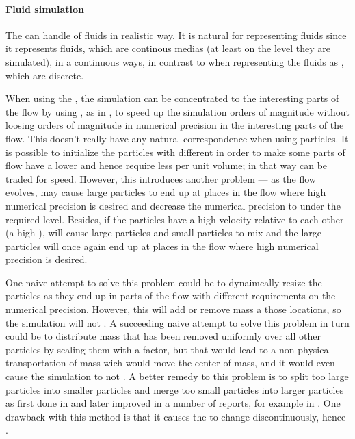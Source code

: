 \paragraph{Fluid simulation}

The \FVM can handle \simulation of fluids in realistic way. It is natural for representing fluids since it represents fluids, which are continous medias (at least on the level they are simulated), in a continuous ways, in contrast to when representing the fluids as , which are discrete.

When using the \FVM, the simulation can be concentrated to the interesting parts of the flow by using , as in \citep{Popinet2003,Losasso2004}, to speed up the simulation orders of magnitude without loosing orders of magnitude in numerical precision in the interesting parts of the flow. This doesn't really have any natural correspondence when using particles. It is possible to initialize the particles with different  %
in order to make some parts of flow have a lower  and hence require less  per unit volume; in that way  can be traded for speed. However, this introduces another problem --- as the flow evolves, \advection may cause large particles to end up at places in the flow where high numerical precision is desired and decrease the numerical precision to under the required level. Besides, if the particles have a high velocity relative to each other (a high \temperature), \diffusion will cause large particles and small particles to mix and the large particles will once again end up at places in the flow where high numerical precision is desired.

One naive attempt to solve this problem could be to dynaimcally resize the particles as they end up in parts of the flow with different requirements on the numerical precision. However, this will add or remove mass a those locations, so the simulation will not . A succeeding naive attempt to solve this problem in turn could be to distribute mass that has been removed uniformly over all other particles by scaling them with a factor, but that would lead to a non-physical transportation of mass wich would move the center of mass, and it would even cause the simulation to not . A better remedy to this problem is to split too large particles into smaller particles and merge too small particles into larger particles as first done in \citep{Desbrun1999} and later improved in a number of reports, for example in \citep{Yan2009}. One drawback with this method is that it causes the  to change discontinuously, hence . %

